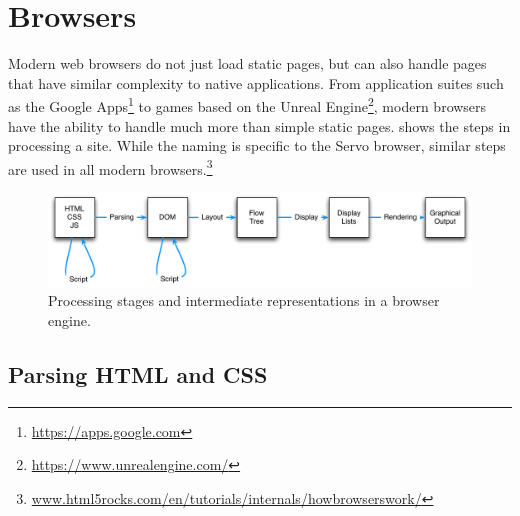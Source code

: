 
\section{Browsers}
\label{sec:browsers}

Modern web browsers do not just load static pages, but can also handle pages that have similar
complexity to native applications.
From application suites such as the Google Apps\footnote{\url{https://apps.google.com}} to games
based on the Unreal Engine\footnote{\url{https://www.unrealengine.com/}},
modern browsers have the ability to handle much more than simple static pages.
 shows the steps in processing a site.
While the naming is specific to the Servo browser, similar steps are used in all modern browsers.\footnote{\url{www.html5rocks.com/en/tutorials/internals/howbrowserswork/}}
\begin{figure}[ht]
  \begin{center}
    \includegraphics[scale=0.7]{pics/browser}
  \end{center}%
  \caption{Processing stages and intermediate representations in a browser engine.}
  \label{fig:browser}
\end{figure}%

\subsection{Parsing HTML and CSS}

